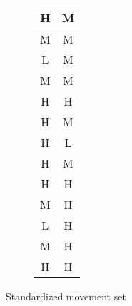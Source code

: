 \begin{figure}[h]
\begin{subfigure}[t]{0.2\textwidth}
\begin{tabular}[t]{||c|c||}
      \hline
      H & M \\
      \hline
      M & M \\
      \hline
      L & M \\
      \hline
      M & M \\
      \hline
      H & H \\
      \hline
      H & M \\
      \hline
      H & L \\
      \hline
      H & M \\
      \hline
      H & H \\
      \hline
      M & H \\
      \hline
      L & H \\
      \hline
      M & H \\
      \hline
      H & H \\
      \hline
    \end{tabular}
    \end{subfigure}
    \caption{Standardized movement set}
    \label{fig: standardized movement set}
\end{figure}

